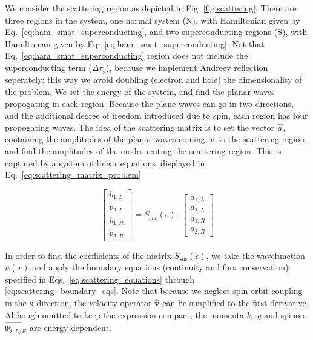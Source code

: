 			We consider the scattering region as depicted in Fig. \ref{fig:scattering}.
			There are three regions in the system, one normal system (N), with Hamiltonian given by Eq.~\eqref{eq:ham_smat_superconducting}, and two superconducting regions (S), with Hamiltonian given by Eq.~\eqref{eq:ham_smat_superconducting}.
			Not that Eq.~\eqref{eq:ham_smat_superconducting} region does not include the superconducting term ($\Delta \tau_y$), because we implement Andreev reflection seperately: this way we avoid doubling (electron and hole) the dimensionality of the problem.
			We set the energy of the system, and find the planar waves propogating in each region.
			Because the plane waves can go in two directions, and the additional degree of freedom introduced due to spin, each region has four propogating waves.
			The idea of the scattering matrix is to set the vector $\vec{a}$, containing the amplitudes of the planar waves coming in to the scattering region, and find the amplitudes of the modes exiting the scattering region.
			This is captured by a system of linear equations, displayed in Eq.~\eqref{eq:scattering_matrix_problem}
			
			\begin{equation}
			\begin{bmatrix} 
			b_{1,L}\\
			b_{2,L}\\
			b_{1,R}\\
			b_{2,R}
			\end{bmatrix} 
			= S_\text{sns}(\epsilon) \cdot 
			\begin{bmatrix} 
			a_{1,L}\\
			a_{2,L}\\
			a_{1,R}\\
			a_{2,R}
			\end{bmatrix}
			\label{eq:scattering_matrix_problem}
			\end{equation}

			In order to find the coefficients of the matrix $S_\text{sns}(\epsilon)$, we take the wavefunction $u(x)$ and apply the boundary equations (continuity and flux conservation): specified in Eqs.~\eqref{eq:scattering_equations} through \eqref{eq:scattering_boundary_eqs}.
			Note that because we neglect spin-orbit coupling in the x-direction, the velocity operator $\hat{\mathbf{v}}$ can be simplified to the first derivative.
			Although omitted to keep the expression compact, the momenta $k_i, q$ and spinors $\vec{\Psi_{i, L/R}}$ are energy dependent.

